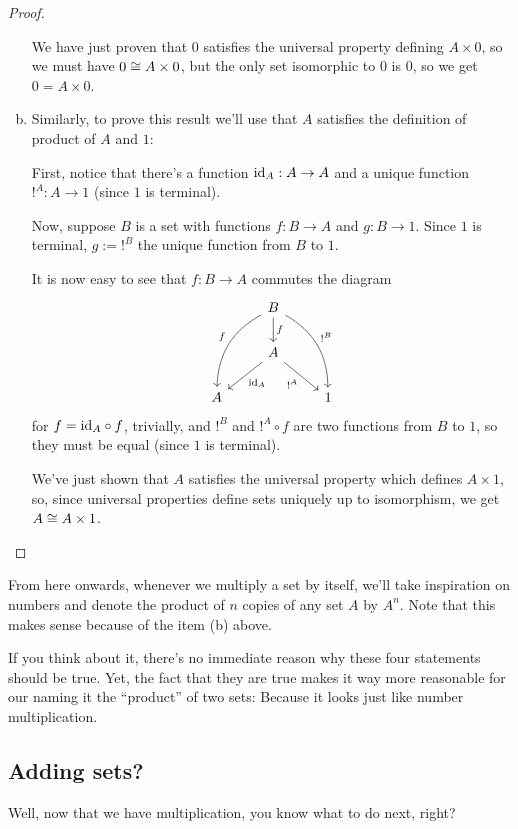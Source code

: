 \begin{proof}
\begin{enumerate}[(a)]
		We have just proven that $0$ satisfies the universal property defining $A\times 0$, so we must have $0\cong A\times 0$, but the only set isomorphic to $0$ is $0$, so we get $0=A\times 0$.
		
		\item Similarly, to prove this result we'll use that $A$ satisfies the definition of product of $A$ and $1$:
		
		First, notice that there's a function ${\rm id}_A:A\to A$ and a unique function $!^A:A\to 1$ (since $1$ is terminal).
		
		Now, suppose $B$ is a set with functions $f:B\to A$ and $g:B\to 1$. Since $1$ is terminal, $g:=!^B$ the unique function from $B$ to $1$. 
		
		It is now easy to see that $f:B\to A$ commutes the diagram
		\[\begin{tikzcd}
		& B \arrow[d, "f"] \arrow[ldd, "f"', bend right] \arrow[rdd, "!^B", bend left] &   \\
		& A \arrow[ld, "\id_A"] \arrow[rd, "!^A"']                                     &   \\
		A &                                                                              & 1
		\end{tikzcd}\]for $f={\rm id}_A\circ f$, trivially, and $!^B$ and $!^A\circ f$ are two functions from $B$ to $1$, so they must be equal (since $1$ is terminal).
		
		We've just shown that $A$ satisfies the universal property which defines $A\times 1$, so, since universal properties define sets uniquely up to isomorphism, we get $A\cong A\times 1$.
	\end{enumerate}
\end{proof}

\begin{rmk}
	From here onwards, whenever we multiply a set by itself, we'll take inspiration on numbers and denote the product of $n$ copies of any set $A$ by $A^n$. Note that this makes sense because of the item (b) above.
\end{rmk}

If you think about it, there's no immediate reason why these four statements should be true. Yet, the fact that they are true makes it way more reasonable for our naming it the ``product'' of two sets: Because it looks just like number multiplication.

\newpage
\subsection{Adding sets?}
Well, now that we have multiplication, you know what to do next, right?

